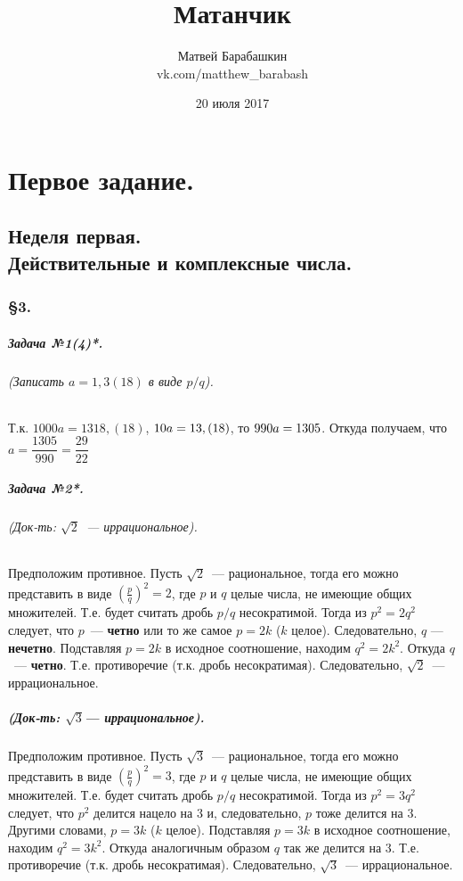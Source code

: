 \documentclass[a4paper,12pt]{report}
\author{Матвей Барабашкин\\vk.com/matthew\_barabash}
\title{Матанчик}
\date{20 июля 2017}
\newcommand*{\hm}[1]{#1\nobreak\discretionary{}
{\hbox{$\mathsurround=0pt #1$}}{}}
\begin{document}

\maketitle

\chapter*{Первое задание.}

\section*{Неделя первая.\\ Действительные и комплексные числа.}

\subsection*{\S3.\\}

\paragraph{Задача №1(4)*.}
\subparagraph{(Записать $ a=1,3(18) $ в виде $ p/q $).}
Т.к. $ 1000a=1318,(18) $, $ 10a\hm=13,(18) $, то 
$ 990a\hm=1305 $. Откуда получаем, что $ a=\dfrac{1305}{990}=\dfrac{29}{22} $

\paragraph{Задача №2*.}\label{sqrt2}
\subparagraph{(Док-ть: $ \sqrt{2} $~--- иррациональное).}
Предположим противное.
Пусть $ \sqrt{2} $~--- рациональное, тогда
его можно представить в виде $ (\frac{p}{q})^2=2 $, где
$ p $ и $ q $ целые числа, не имеющие общих множителей.
Т.е. будет считать дробь $ p/q $ несократимой. Тогда
из $ p^2=2q^2 $ следует, что $ p $~--- \textbf{четно} или
то же самое $ p=2k $ ($ k $ целое). Следовательно,
$ q $ --- \textbf{нечетно}. 
Подставляя $ p=2k $ в исходное соотношение, находим
$ q^2=2k^2 $. Откуда $ q $~--- \textbf{четно}. 
Т.е. противоречие (т.к. дробь несократимая). Следовательно,
$ \sqrt{2} $~--- иррациональное.

\paragraph{(Док-ть: $ \sqrt{3} $--- иррациональное).}
Предположим противное.
Пусть $ \sqrt{3} $~--- рациональное, тогда
его можно представить в виде $ (\frac{p}{q})^2=3 $, где
$ p $ и $ q $ целые числа, не имеющие общих множителей.
Т.е. будет считать дробь $ p/q $ несократимой. Тогда
из $ p^2=3q^2 $ следует, что $ p^2 $ делится нацело на 3
и, следовательно, $ p $ тоже делится на 3.
Другими словами, $ p=3k $ ($ k $ целое).
Подставляя $ p=3k $ в исходное соотношение, находим
$ q^2=3k^2 $. Откуда аналогичным образом $ q $ так же делится на 3. 
Т.е. противоречие (т.к. дробь несократимая). Следовательно,
$ \sqrt{3} $~--- иррациональное.
\end{document}
